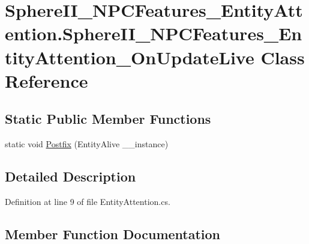 \hypertarget{class_sphere_i_i___n_p_c_features___entity_attention_1_1_sphere_i_i___n_p_c_features___entity_attention___on_update_live}{}\section{Sphere\+I\+I\+\_\+\+N\+P\+C\+Features\+\_\+\+Entity\+Attention.\+Sphere\+I\+I\+\_\+\+N\+P\+C\+Features\+\_\+\+Entity\+Attention\+\_\+\+On\+Update\+Live Class Reference}
\label{class_sphere_i_i___n_p_c_features___entity_attention_1_1_sphere_i_i___n_p_c_features___entity_attention___on_update_live}
\subsection*{Static Public Member Functions}
\begin{DoxyCompactItemize}
\item 
static void \mbox{\hyperlink{class_sphere_i_i___n_p_c_features___entity_attention_1_1_sphere_i_i___n_p_c_features___entity_attention___on_update_live_ac61f554598c3d6519fc894dc2d671c10}{Postfix}} (Entity\+Alive \+\_\+\+\_\+instance)
\end{DoxyCompactItemize}


\subsection{Detailed Description}


Definition at line 9 of file Entity\+Attention.\+cs.



\subsection{Member Function Documentation}
\mbox{\label{class_sphere_i_i___n_p_c_features___entity_attention_1_1_sphere_i_i___n_p_c_features___entity_attention___on_update_live_ac61f554598c3d6519fc894dc2d671c10}} 
